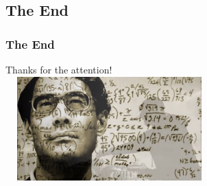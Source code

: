 \documentclass[9pt]{beamer}
\begin{document}
        \subsection{The End}
        \begin{frame}
            \frametitle{The End}
            \begin{center}
                Thanks for the attention!\\\vspace{0.25cm}
                \includegraphics[width=8cm,height=4cm]{images/photo2.jpg}\\\vspace{0.25cm}
                \hyperlink{init}{}\\
            \end{center}
        \end{frame}
    
\end{document}
